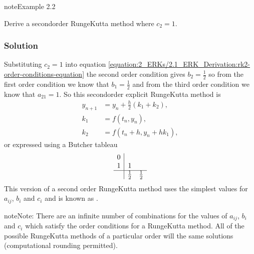 \documentclass[letterpaper,10pt,english]{jupyterBook}
\begin{document}
\begin{sphinxadmonition}{note}{Example 2.2}

\sphinxAtStartPar
Derive a second\sphinxhyphen{}order Runge\sphinxhyphen{}Kutta method where \(c_2 = 1\).
\subsubsection*{Solution}

\sphinxAtStartPar
Substituting \(c_2 = 1\) into equation \eqref{equation:2_ERKs/2.1_ERK_Derivation:rk2-order-conditions-equation} the second order condition gives \(b_2 = \frac{1}{2}\) so from the first order condition we know that \(b_1 = \frac{1}{2}\) and from the third order condition we know that \(a_{21} = 1\). So this second\sphinxhyphen{}order explicit Runge\sphinxhyphen{}Kutta method is
\begin{align*}
    y_{n+1} &=y_n +\frac{h}{2}(k_1 +k_2 ),\\
    k_1 &=f(t_n ,y_n ),\\
    k_2 &=f(t_n +h,y_n +hk_1 ),
\end{align*}
\sphinxAtStartPar
or expressed using a Butcher tableau
\begin{align*}
    \begin{array}{c|cc}
    0 & & \\
    1 & 1 & \\ \hline
    & \frac{1}{2} & \frac{1}{2}
    \end{array}
\end{align*}
\sphinxAtStartPar
This version of a second order Runge\sphinxhyphen{}Kutta method uses the simplest values for \(a_{ij}\), \(b_i\) and \(c_i\) and is known as .
\end{sphinxadmonition}

\begin{sphinxadmonition}{note}{Note:}
\sphinxAtStartPar
There are an infinite number of combinations for the values of \(a_{ij}\), \(b_i\) and \(c_i\) which satisfy the order conditions for a Runge\sphinxhyphen{}Kutta method. All of the possible Runge\sphinxhyphen{}Kutta methods of a particular order will the same solutions (computational rounding permitted).
\end{sphinxadmonition}
\end{document}
